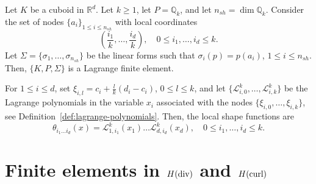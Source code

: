 \begin{lemma}\label{lemma:tensor_product_lagrange_fe}
    Let $K$ be a cuboid in $\mathbb{R}^d$. Let $k \ge 1$, let $P = \mathbb{Q}_k$, and let $n_{sh} = \dim \mathbb{Q}_k$. Consider the set of nodes $\{a_i\}_{1 \le i \le n_{sh}}$ with local coordinates
    \begin{equation}
        \left(\frac{i_1}{k}, \dots, \frac{i_d}{k}\right), \quad 0 \le i_1, \dots, i_d \le k.
    \end{equation}
    Let $\Sigma = \{\sigma_1, \dots, \sigma_{n_{sh}}\}$ be the linear forms such that $\sigma_i(p) = p(a_i)$, $1 \le i \le n_{sh}$. Then, $\{K, P, \Sigma\}$ is a Lagrange finite element.
\end{lemma}
For $1 \le i \le d$, set $\xi_{i,l} = c_i + \frac{l}{k}(d_i - c_i)$, $0 \le l \le k$, and let $\{\mathcal{L}_{i,0}^k, \dots, \mathcal{L}_{i,k}^k\}$ be the Lagrange polynomials in the variable $x_i$ associated with the nodes $\{\xi_{i,0}, \dots, \xi_{i,k}\}$, see Definition~\ref{def:lagrange-polynomials}. Then, the local shape functions are
\begin{equation*}
    \theta_{i_1 \dots i_d}(x) = \mathcal{L}_{1,i_1}^k(x_1) \dots \mathcal{L}_{d,i_d}^k(x_d), \quad 0 \le i_1, \dots, i_d \le k.
\end{equation*}

\section{Finite elements in $H(\operatorname{\text{div}})$ and $H(\operatorname{\text{curl}})$}\label{sec:finite-elements-Hdiv-Hcurl}
